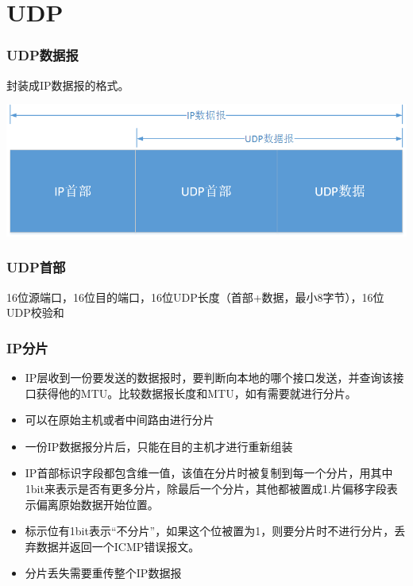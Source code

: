 \section{UDP}

\subsubsection{UDP数据报}

封装成IP数据报的格式。

\includegraphics[scale=0.5]{protocol/resources/UDP-IP.png}


\subsubsection{UDP首部}

16位源端口，16位目的端口，16位UDP长度（首部+数据，最小8字节），16位UDP校验和

\subsubsection{IP分片}

\begin{itemize}
\item IP层收到一份要发送的数据报时，要判断向本地的哪个接口发送，并查询该接口获得他的MTU。比较数据报长度和MTU，如有需要就进行分片。

\item 可以在原始主机或者中间路由进行分片

\item 一份IP数据报分片后，只能在目的主机才进行重新组装

\item IP首部标识字段都包含维一值，该值在分片时被复制到每一个分片，用其中1bit来表示是否有更多分片，除最后一个分片，其他都被置成1.片偏移字段表示偏离原始数据开始位置。

\item 标示位有1bit表示“不分片”，如果这个位被置为1，则要分片时不进行分片，丢弃数据并返回一个ICMP错误报文。

\item 分片丢失需要重传整个IP数据报
\end{itemize}

